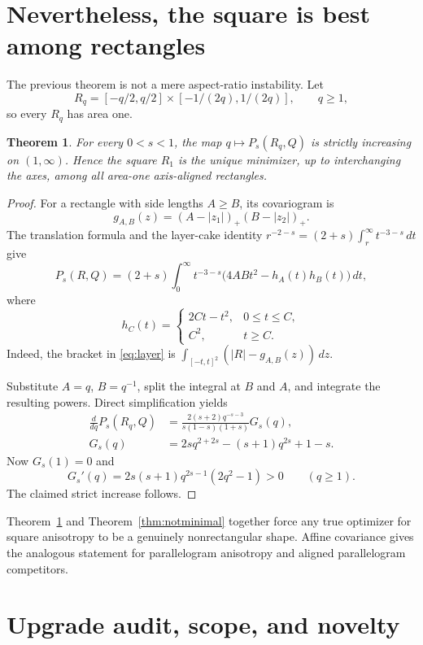 \documentclass[11pt]{article}
\newtheorem{theorem}{Theorem}
\newcommand{\cQ}{Q}
\newcommand{\Ps}{P_s}
\begin{document}
\section{Nevertheless, the square is best among rectangles}

The previous theorem is not a mere aspect-ratio instability.  Let
\[
 R_q=[-q/2,q/2]\times[-1/(2q),1/(2q)],\qquad q\ge1,
\]
so every $R_q$ has area one.

\begin{theorem}\label{thm:rectangles}
For every $0<s<1$, the map
$q\mapsto\Ps(R_q,\cQ)$ is strictly increasing on $(1,\infty)$.  Hence the
square $R_1$ is the unique minimizer, up to interchanging the axes, among all
area-one axis-aligned rectangles.
\end{theorem}

\begin{proof}
For a rectangle with side lengths $A\ge B$, its covariogram is
\[
 g_{A,B}(z)=(A-|z_1|)_+(B-|z_2|)_+.
\]
The translation formula and the layer-cake identity
$r^{-2-s}=(2+s)\int_r^\infty t^{-3-s}\,dt$ give
\begin{equation}\label{eq:layer}
 \Ps(R,\cQ)=(2+s)\int_0^\infty t^{-3-s}
 \bigl(4ABt^2-h_A(t)h_B(t)\bigr)\,dt,
\end{equation}
where
\[
 h_C(t)=
 \begin{cases}2Ct-t^2,&0\le t\le C,\\ C^2,&t\ge C.\end{cases}
\]
Indeed, the bracket in \eqref{eq:layer} is
$\int_{[-t,t]^2}(|R|-g_{A,B}(z))\,dz$.

Substitute $A=q$, $B=q^{-1}$, split the integral at $B$ and $A$, and integrate
the resulting powers.  Direct simplification yields
\begin{align*}
 \frac d{dq}\Ps(R_q,\cQ)
  &=\frac{2(s+2)q^{-s-3}}{s(1-s)(1+s)}G_s(q),\\
 G_s(q)&=2s q^{2+2s}-(s+1)q^{2s}+1-s.
\end{align*}
Now $G_s(1)=0$ and
\[
 G_s'(q)=2s(s+1)q^{2s-1}(2q^2-1)>0
 \qquad(q\ge1).
\]
The claimed strict increase follows.
\end{proof}

Theorem~\ref{thm:rectangles} and Theorem~\ref{thm:notminimal} together force
any true optimizer for square anisotropy to be a genuinely nonrectangular
shape.  Affine covariance gives the analogous statement for parallelogram
anisotropy and aligned parallelogram competitors.

\section{Upgrade audit, scope, and novelty}
\end{document}
